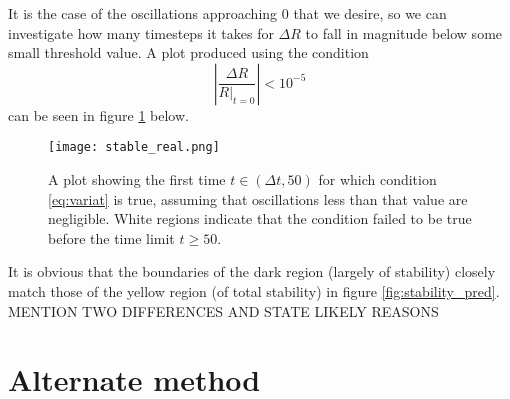 \documentclass[11pt]{article}
\begin{document}
It is the case of the oscillations approaching $0$ that we desire, so we can investigate how many timesteps it takes for $\Delta R$ to fall in magnitude below some small threshold value. A plot produced using the condition
\begin{equation}
\left|\frac{\Delta R}{R|_{t=0}}\right|<10^{-5}		\label{eq:variat}
\end{equation}
can be seen in figure \ref{fig:stable_real} below.
\begin{figure}[H]
\centering
\texttt{[image: stable\_real.png]}
\caption{A plot showing the first time $t\in(\Delta t,50)$ for which condition \ref{eq:variat} is true, assuming that oscillations less than that value are negligible. White regions indicate that the condition failed to be true before the time limit $t\geq 50$.}
\label{fig:stable_real}
\end{figure}
It is obvious that the boundaries of the dark region (largely of stability) closely match those of the yellow region (of total stability) in figure \ref{fig:stability_pred}. MENTION TWO DIFFERENCES AND STATE LIKELY REASONS

\section{Alternate method}

\newpage


\end{document}
